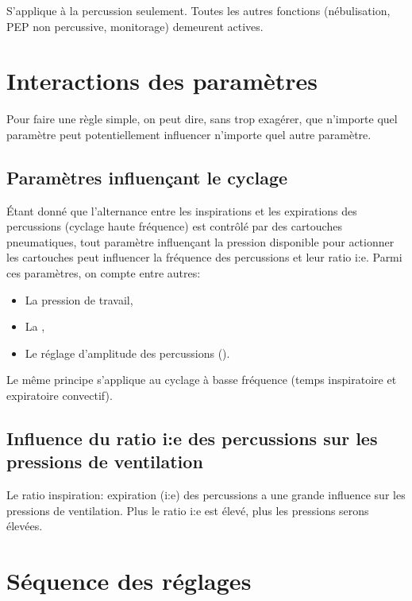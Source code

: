 S'applique à la percussion seulement. Toutes les autres fonctions
(nébulisation, PEP non percussive, monitorage) demeurent actives.

\section{Interactions des paramètres}

Pour faire une règle simple, on peut dire, sans trop exagérer, que
n'importe quel paramètre peut potentiellement influencer n'importe
quel autre paramètre. 

\subsection{Paramètres influençant le cyclage}

Étant donné que l'alternance entre les inspirations et les expirations
des percussions (cyclage haute fréquence)  est contrôlé par des
cartouches pneumatiques, tout paramètre influençant la pression
disponible pour actionner les cartouches peut influencer la fréquence
des percussions et leur ratio i:e.  Parmi ces paramètres, on compte
entre autres:

\begin{itemize} \item La pression de travail, \item La \fio, \item Le
réglage d'amplitude des percussions ().
\end{itemize}

Le même principe s'applique au cyclage à basse fréquence (temps
inspiratoire et expiratoire convectif).

\subsection{Influence du ratio i:e des percussions sur les pressions
de ventilation}

Le ratio inspiration: expiration (i:e) des percussions a une grande
influence sur les pressions de ventilation. Plus le ratio i:e est
élevé, plus les pressions serons élevées.


\section{Séquence des réglages}

